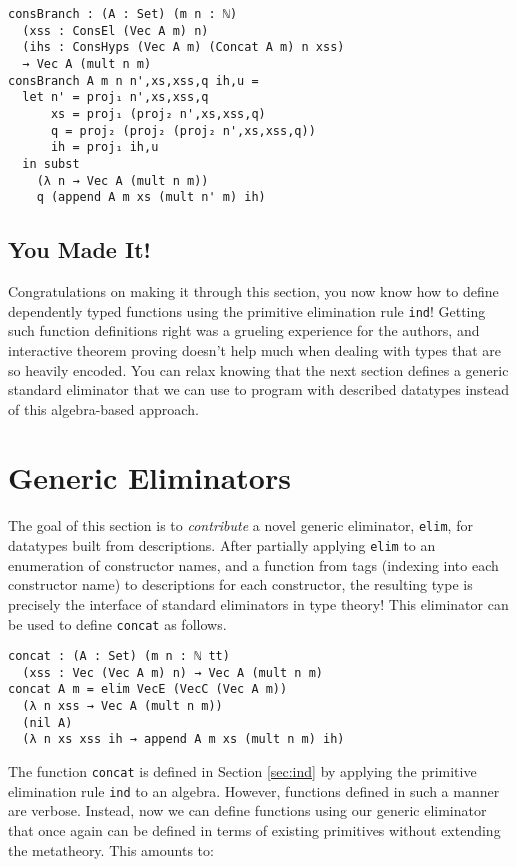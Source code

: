 \documentclass[preprint,nonatbib]{sigplanconf}
\newcommand{\refsec}[1]{Section \ref{sec:#1}}
\begin{document}
\begin{verbatim}
consBranch : (A : Set) (m n : ℕ)
  (xss : ConsEl (Vec A m) n)
  (ihs : ConsHyps (Vec A m) (Concat A m) n xss)
  → Vec A (mult n m)
consBranch A m n n',xs,xss,q ih,u =
  let n' = proj₁ n',xs,xss,q
      xs = proj₁ (proj₂ n',xs,xss,q)
      q = proj₂ (proj₂ (proj₂ n',xs,xss,q))
      ih = proj₁ ih,u
  in subst
    (λ n → Vec A (mult n m))
    q (append A m xs (mult n' m) ih)
\end{verbatim}

\subsection{You Made It!}

Congratulations on making it through this section, you now know how to define dependently typed
functions using the primitive elimination rule {\tt ind}!
Getting such function definitions right was a grueling experience for
the authors, and interactive theorem proving doesn't help much when
dealing with types that are so heavily encoded. You can relax knowing
that the next section defines a generic standard eliminator that we
can use to program with described datatypes instead of this
algebra-based approach.

\section{Generic Eliminators}
\label{sec:elim}

The goal of this section is to {\it contribute} a novel generic
eliminator, {\tt elim}, for datatypes built from descriptions.
After partially applying {\tt elim} to an enumeration of constructor
names, and a function from tags (indexing into each constructor name)
to descriptions for each constructor, the resulting type is precisely
the interface of standard eliminators in type theory!  This eliminator can
be used to define {\tt concat} as follows.

\begin{verbatim}
concat : (A : Set) (m n : ℕ tt)
  (xss : Vec (Vec A m) n) → Vec A (mult n m)
concat A m = elim VecE (VecC (Vec A m))
  (λ n xss → Vec A (mult n m))
  (nil A)
  (λ n xs xss ih → append A m xs (mult n m) ih)
\end{verbatim}



The function {\tt concat} is defined in \refsec{ind} by applying the
primitive elimination rule {\tt ind} to an algebra. However,
functions defined in such a manner are verbose. Instead, now we
can define functions using our generic eliminator that once again can
be defined in terms of existing primitives without extending the
metatheory. This amounts to:
\end{document}
